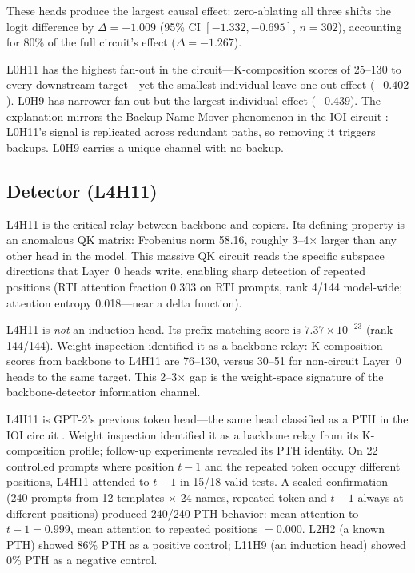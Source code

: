 \documentclass{article}
\begin{document}
These heads produce the largest causal effect: zero-ablating all three
shifts the logit difference by $\Delta = -1.009$ (95\% CI
$[-1.332, -0.695]$, $n = 302$), accounting for 80\% of the full
circuit's effect ($\Delta = -1.267$).

L0H11 has the highest fan-out in the circuit---K-composition scores of
25--130 to every downstream target---yet the smallest individual
leave-one-out effect ($-0.402$). L0H9 has narrower fan-out but the
largest individual effect ($-0.439$). The explanation mirrors the
Backup Name Mover phenomenon in the IOI circuit \citep{wang2023ioi}:
L0H11's signal is replicated across redundant paths, so removing it
triggers backups. L0H9 carries a unique channel with no backup.

\subsection{Detector (L4H11)}

L4H11 is the critical relay between backbone and copiers. Its defining
property is an anomalous QK matrix: Frobenius norm 58.16, roughly
3--4$\times$ larger than any other head in the model. This massive QK
circuit reads the specific subspace directions that Layer~0 heads write,
enabling sharp detection of repeated positions (RTI attention fraction
0.303 on RTI prompts, rank 4/144 model-wide; attention entropy
0.018---near a delta function).

L4H11 is \emph{not} an induction head. Its prefix matching score is
$7.37 \times 10^{-23}$ (rank 144/144). Weight inspection
identified it as a backbone relay: K-composition scores from backbone
to L4H11 are 76--130, versus 30--51 for non-circuit Layer~0 heads to
the same target. This 2--3$\times$ gap is the weight-space signature
of the backbone-detector information channel.

L4H11 is GPT-2's previous token head---the same head classified as
a PTH in the IOI circuit \citep{wang2023ioi}. Weight inspection
identified it as a backbone relay from its K-composition profile;
follow-up experiments revealed its PTH identity. On 22 controlled
prompts where position $t{-}1$ and the repeated token occupy different
positions, L4H11 attended to $t{-}1$ in 15/18 valid tests. A
scaled confirmation (240 prompts from 12 templates $\times$
24 names, repeated token and $t{-}1$ always at different positions)
produced 240/240 PTH behavior: mean attention to $t{-}1 = 0.999$,
mean attention to repeated positions $= 0.000$. L2H2 (a known PTH)
showed 86\% PTH as a positive control; L11H9 (an induction head)
showed 0\% PTH as a negative control.
\end{document}
